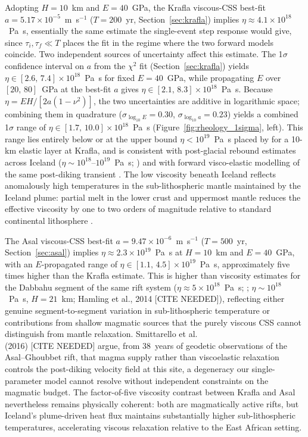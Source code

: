 \documentclass[extra]{gji}
\makeatletter
\DeclareRobustCommand\citealt
   {\begingroup\NAT@swafalse\def\NAT@ctype{0}\NAT@parfalse\NAT@citetp}
\makeatother
\begin{document}
Adopting $H = 10$~km and $E = 40$~GPa, the Krafla viscous-CSS best-fit
$a = 5.17\times10^{-5}$~m~s$^{-1}$ ($T=200$~yr, Section~\ref{sec:krafla})
implies $\eta \approx 4.1\times10^{18}$~Pa~s, essentially the same estimate
the single-event step response would give, since $\tau_i,\tau_f \ll T$ places
the fit in the regime where the two forward models coincide.  Two
independent sources of uncertainty affect this estimate.  The 1$\sigma$
confidence interval on $a$ from the $\chi^2$ fit (Section~\ref{sec:krafla})
yields $\eta \in [2.6,\,7.4]\times10^{18}$~Pa~s for fixed $E = 40$~GPa, while
propagating $E$ over $[20,\,80]$~GPa at the best-fit $a$ gives
$\eta \in [2.1,\,8.3]\times10^{18}$~Pa~s.  Because $\eta = EH/[2a(1-\nu^2)]$,
the two uncertainties are additive in logarithmic space; combining them in
quadrature ($\sigma_{\log_{10} E} = 0.30$, $\sigma_{\log_{10} a} = 0.23$)
yields a combined 1$\sigma$ range of
$\eta \in [1.7,\,10.0]\times10^{18}$~Pa~s
(Figure~\ref{fig:rheology_1sigma}, left).  This range lies entirely below or at
the upper bound $\eta < 10^{19}$~Pa~s placed by \citet{sigmundsson1991postglacial} for a 10-km
elastic layer at Krafla, and is consistent with post-glacial rebound estimates
across Iceland ($\eta \sim 10^{18}$--$10^{19}$~Pa~s; \citealt{sigmundsson2010geodetic})
and with forward visco-elastic modelling of the same post-diking transient
\citep{hofton1996post}.  The low viscosity beneath Iceland reflects
anomalously high temperatures in the sub-lithospheric mantle maintained by the
Iceland plume: partial melt in the lower crust and uppermost mantle reduces the
effective viscosity by one to two orders of magnitude relative to standard
continental lithosphere \citep{holtzman2016questions}.

The Asal viscous-CSS best-fit $a = 9.47\times10^{-6}$~m~s$^{-1}$
($T=500$~yr, Section~\ref{sec:asal}) implies $\eta \approx 2.3\times10^{19}$~Pa~s
at $H = 10$~km and $E = 40$~GPa, with an $E$-propagated range of
$\eta \in [1.1,\,4.5]\times10^{19}$~Pa~s, approximately five times higher
than the Krafla estimate.  This is higher
than viscosity estimates for the Dabbahu segment of the same rift system
($\eta \approx 5\times10^{18}$~Pa~s; \citealt{nooner2009post};
$\eta \sim 10^{18}$~Pa~s, $H = 21$~km; Hamling et al., 2014 [CITE NEEDED]), reflecting
either genuine segment-to-segment variation in sub-lithospheric temperature
or contributions from shallow magmatic sources that the purely viscous CSS
cannot distinguish from mantle relaxation.  Smittarello et al.\\ (2016) [CITE NEEDED]
argue, from 38~years of geodetic observations of the Asal--Ghoubbet rift,
that magma supply rather than viscoelastic relaxation controls the
post-diking velocity field at this site, a degeneracy our single-parameter
model cannot resolve without independent constraints on the magmatic budget.
The factor-of-five viscosity contrast between Krafla and Asal nevertheless
remains physically coherent: both are magmatically active rifts, but
Iceland's plume-driven heat flux maintains substantially higher
sub-lithospheric temperatures, accelerating viscous relaxation relative to
the East African setting.
\end{document}
